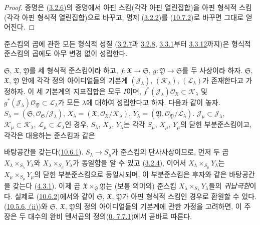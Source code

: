 \begin{proof}
증명은 (\hyperref[I.3.2.6-ko]{3.2.6})의 증명에서 아핀 스킴(각각
아핀 열린집합)을 아핀 형식적 스킴(각각 아핀 형식적 열린집합)으로
바꾸고, 명제 (\hyperref[I.3.2.2-ko]{3.2.2})를
(\hyperref[I.10.7.2-ko]{10.7.2})로 바꾸면 그대로 얻어진다.
\end{proof}

준스킴의 곱에 관한 모든 형식적 성질
(\hyperref[I.3.2.7-ko]{3.2.7}과
\hyperref[I.3.2.8-ko]{3.2.8},
\hyperref[I.3.3.1-ko]{3.3.1}부터
\hyperref[I.3.3.12-ko]{3.3.12}까지)은
형식적 준스킴의 곱에도 아무 변경 없이 성립한다.

\begin{env}[10.7.4]
\label{I.10.7.4-ko}
$\mathfrak{S}$, $\mathfrak{X}$, $\mathfrak{Y}$를 세 형식적 준스킴이라
하고, $f:\mathfrak{X}\to\mathfrak{S}$,
$g:\mathfrak{Y}\to\mathfrak{S}$를 두 사상이라 하자.
$\mathfrak{S}$, $\mathfrak{X}$, $\mathfrak{Y}$ 안에 각각 정의
아이디얼들의 기본계 $(\mathscr{J}_\lambda)$,
$(\mathscr{K}_\lambda)$, $(\mathscr{L}_\lambda)$가 존재한다고 가정하자.
이 세 기본계의 지표집합은 모두 $I$이며,
$f^*(\mathscr{J}_\lambda)\mathscr{O}_{\mathfrak{X}}
\subset\mathscr{K}_\lambda$ 및
$g^*(\mathscr{J}_\lambda)\mathscr{O}_{\mathfrak{Y}}
\subset\mathscr{L}_\lambda$가 모든 $\lambda$에 대하여 성립한다고 하자.
다음과 같이 놓자.
$S_\lambda=(\mathfrak{S},
\mathscr{O}_{\mathfrak{S}}/\mathscr{J}_\lambda)$,
$X_\lambda=(\mathfrak{X},
\mathscr{O}_{\mathfrak{X}}/\mathscr{K}_\lambda)$,
$Y_\lambda=(\mathfrak{Y},
\mathscr{O}_{\mathfrak{Y}}/\mathscr{L}_\lambda)$.
$\mathscr{J}_\mu\subset\mathscr{J}_\lambda$,
$\mathscr{K}_\mu\subset\mathscr{K}_\lambda$,
$\mathscr{L}_\mu\subset\mathscr{L}_\lambda$인 경우,
$S_\lambda$, $X_\lambda$, $Y_\lambda$는 각각
$S_\mu$, $X_\mu$, $Y_\mu$의 닫힌 부분준스킴이고, 각각은 대응하는
준스킴과 같은


바탕공간을 갖는다(\hyperref[I.10.6.1-ko]{10.6.1}).
$S_\lambda\to S_\mu$가 준스킴의 단사사상이므로, 먼저 두 곱
$X_\lambda\times_{S_\lambda}Y_\lambda$와
$X_\lambda\times_{S_\mu}Y_\lambda$가 동일함을 알 수 있고
(\hyperref[I.3.2.4-ko]{3.2.4}), 이어서
$X_\lambda\times_{S_\mu}Y_\lambda$는
$X_\mu\times_{S_\mu}Y_\mu$의 닫힌 부분준스킴으로 동일시되며, 이
부분준스킴은 후자와 같은 바탕공간을 갖는다
(\hyperref[I.4.3.1-ko]{4.3.1}). 이제 곱
$\mathfrak{X}\times_{\mathfrak{S}}\mathfrak{Y}$는 (보통 의미의) 준스킴
$X_\lambda\times_{S_\lambda}Y_\lambda$들의 \emph{귀납극한}이다. 실제로
(\hyperref[I.10.6.2-ko]{10.6.2})에서와 같이
$\mathfrak{S}$, $\mathfrak{X}$, $\mathfrak{Y}$가 아핀 형식적 스킴인
경우로 환원할 수 있다. (\hyperref[I.10.5.6-ko]{10.5.6, (ii)})와
$\mathfrak{S}$, $\mathfrak{X}$, $\mathfrak{Y}$의 정의 아이디얼들의
기본계에 관한 가정을 고려하면, 이 주장은 두 대수의 완비 텐서곱의
정의(\hyperref[0.7.7.1-ko]{0, 7.7.1})에서 곧바로 따른다.


\end{env}
